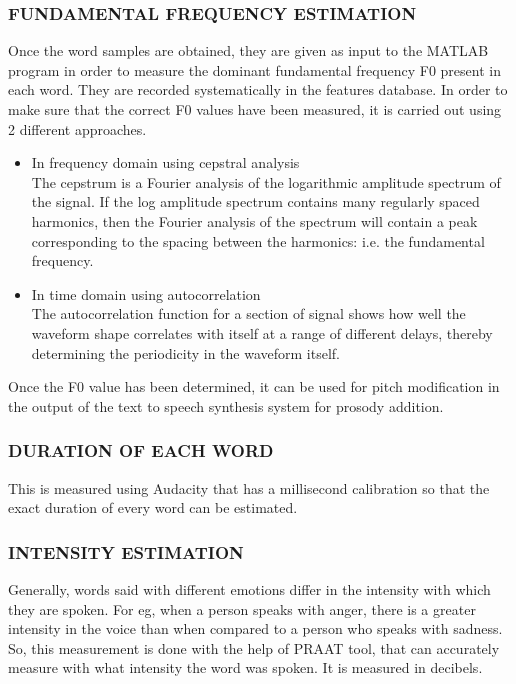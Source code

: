 \documentclass{article}
\begin{document}
\subsubsection{FUNDAMENTAL FREQUENCY ESTIMATION}
Once the word samples are obtained, they are given as input to the MATLAB program in order to measure the dominant fundamental frequency F0 present in each word. They are recorded systematically in the features database. In order to make sure that the correct F0 values have been measured, it is carried out using 2 different approaches. 
\begin{itemize}
\item In frequency domain using cepstral analysis
\\The cepstrum is a Fourier analysis of the logarithmic amplitude spectrum of the signal.  If the log amplitude spectrum contains many regularly spaced harmonics, then the Fourier analysis of the spectrum will contain  a peak corresponding to the spacing between the harmonics: i.e. the fundamental frequency.
\item In time domain using autocorrelation 
\\The autocorrelation function for a section of signal shows how well the waveform shape correlates with itself at a range of different delays, thereby determining the periodicity in the waveform itself.
\end{itemize}
Once the F0 value has been determined, it can be used for pitch modification in the output of the text to speech synthesis system for prosody addition.\\
\subsubsection{DURATION OF EACH WORD }
This is measured using Audacity that has a millisecond calibration so that the exact duration of every word can be estimated.\\
\subsubsection{INTENSITY ESTIMATION}
Generally, words said with different emotions differ in the intensity with which they are spoken. For eg, when a person speaks with anger, there is a greater intensity in the voice than when compared to a person who speaks with sadness. So, this measurement is done with the help of PRAAT tool, that can accurately measure with what intensity the word was spoken. It is measured in decibels. 
\end{document}
